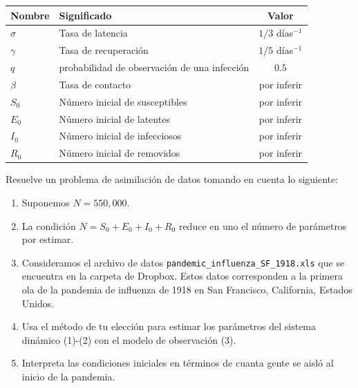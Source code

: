 \documentclass[12pt,spanish,mexico]{article}
\numberwithin{equation}{section}
\theoremstyle{definition}
\theoremstyle{remark}
\begin{document}
\begin{center}
\begin{tabular}{|l|l|c|}
\hline
\textbf{Nombre} & \textbf{Significado} & \textbf{Valor} \\
\hline
$\sigma$ & Tasa de latencia & $1/3$ días$^{-1}$ \\
\hline
$\gamma$ & Tasa de recuperación & $1/5$ días$^{-1}$ \\
\hline
$q$ & probabilidad de observación de una infección & $0.5$ \\
\hline
$\beta$ & Tasa de contacto & por inferir \\
\hline
$S_0$ & Número inicial de susceptibles & por inferir \\
\hline
$E_0$ & Número inicial de latentes & por inferir \\
\hline
$I_0$ & Número inicial de infecciosos & por inferir \\
\hline
$R_0$ & Número inicial de removidos & por inferir \\
\hline
\end{tabular}
\end{center}

Resuelve un problema de asimilación de datos tomando en cuenta lo siguiente:

\begin{enumerate}
\item Suponemos $N = 550,000$.
\item La condición $N = S_0 + E_0 + I_0 + R_0$ reduce en uno el número de parámetros por estimar.
\item Consideramos el archivo de datos \texttt{pandemic\_influenza\_SF\_1918.xls} que se encuentra en la carpeta de Dropbox. Estos datos corresponden a la primera ola de la pandemia de influenza de 1918 en San Francisco, California, Estados Unidos.
\item Usa el método de tu elección para estimar los parámetros del sistema dinámico (1)-(2) con el modelo de observación (3).
\item Interpreta las condiciones iniciales en términos de cuanta gente se aisló al inicio de la pandemia.
\end{enumerate}
\end{document}
